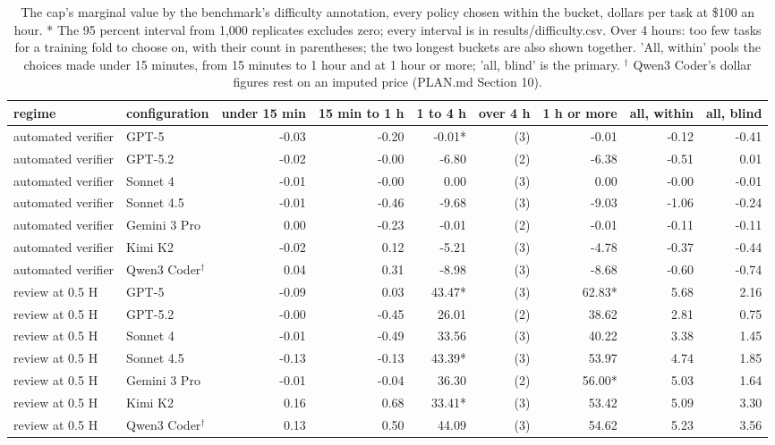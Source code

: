\begin{table}[t]
\centering
\small
\caption{The cap's marginal value by the benchmark's difficulty annotation, every policy chosen within the bucket, dollars per task at \$100 an hour. * The 95 percent interval from 1,000 replicates excludes zero; every interval is in results/difficulty.csv. Over 4 hours: too few tasks for a training fold to choose on, with their count in parentheses; the two longest buckets are also shown together. 'All, within' pools the choices made under 15 minutes, from 15 minutes to 1 hour and at 1 hour or more; 'all, blind' is the primary. $^\dagger$ Qwen3 Coder's dollar figures rest on an imputed price (PLAN.md Section 10).}
\label{tab:tableA6_difficulty}
\begin{tabular}{llrrrrrrr}
\toprule
regime & configuration & under 15 min & 15 min to 1 h & 1 to 4 h & over 4 h & 1 h or more & all, within & all, blind \\
\midrule
automated verifier & GPT-5 & -0.03 & -0.20 & -0.01* & (3) & -0.01 & -0.12 & -0.41 \\
automated verifier & GPT-5.2 & -0.02 & -0.00 & -6.80 & (2) & -6.38 & -0.51 & 0.01 \\
automated verifier & Sonnet 4 & -0.01 & -0.00 & 0.00 & (3) & 0.00 & -0.00 & -0.01 \\
automated verifier & Sonnet 4.5 & -0.01 & -0.46 & -9.68 & (3) & -9.03 & -1.06 & -0.24 \\
automated verifier & Gemini 3 Pro & 0.00 & -0.23 & -0.01 & (2) & -0.01 & -0.11 & -0.11 \\
automated verifier & Kimi K2 & -0.02 & 0.12 & -5.21 & (3) & -4.78 & -0.37 & -0.44 \\
automated verifier & Qwen3 Coder$^\dagger$ & 0.04 & 0.31 & -8.98 & (3) & -8.68 & -0.60 & -0.74 \\
\midrule
review at 0.5 H & GPT-5 & -0.09 & 0.03 & 43.47* & (3) & 62.83* & 5.68 & 2.16 \\
review at 0.5 H & GPT-5.2 & -0.00 & -0.45 & 26.01 & (2) & 38.62 & 2.81 & 0.75 \\
review at 0.5 H & Sonnet 4 & -0.01 & -0.49 & 33.56 & (3) & 40.22 & 3.38 & 1.45 \\
review at 0.5 H & Sonnet 4.5 & -0.13 & -0.13 & 43.39* & (3) & 53.97 & 4.74 & 1.85 \\
review at 0.5 H & Gemini 3 Pro & -0.01 & -0.04 & 36.30 & (2) & 56.00* & 5.03 & 1.64 \\
review at 0.5 H & Kimi K2 & 0.16 & 0.68 & 33.41* & (3) & 53.42 & 5.09 & 3.30 \\
review at 0.5 H & Qwen3 Coder$^\dagger$ & 0.13 & 0.50 & 44.09 & (3) & 54.62 & 5.23 & 3.56 \\
\bottomrule
\end{tabular}
\end{table}
